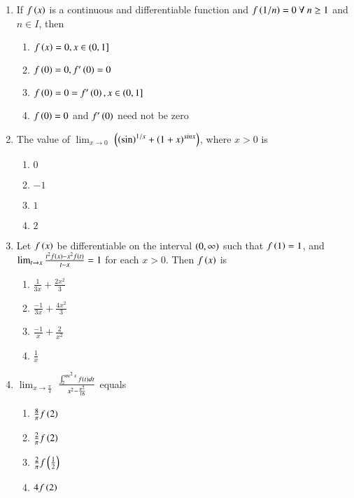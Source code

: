 \documentclass[journal,12pt,onecolumn]{IEEEtran}
\theoremstyle{remark}
\begin{document}
\begin{enumerate}
\item %

	If $f\left(x\right)$ is a continuous and differentiable function and $f\left(1/n\right)=0\ \forall\ n\geq1$ and$ n\in I$, then   \hfill{}
    \begin{enumerate}
	    \item $f\left(x\right)=0,x\in(0,1]$
	    \item $f\left(0\right)=0,f^{\prime}\left(0\right)=0$
	    \item $f\left(0\right)=0=f^{\prime}\left(0\right), x\in(0,1]$
	    \item $f\left(0\right)=0$ and $f^{\prime}\left(0\right)$ need not be zero\\
    \end{enumerate}


\item %

	The value of $\lim_{x \to 0}$ $\left( \left(\sin\right)^{1/x} + \left(1+x\right)^{sinx}\right)$, where $x > 0$ is \hfill{}
    \begin{enumerate}
     \item $0$
     \item $-1$
     \item $1$
     \item $2$\\
    \end{enumerate}

\newpage
\item %

	Let $f\left(x\right)$ be differentiable on the interval $\left(0,\infty\right)$ such that $f\left(1\right)=1$, and $\lim_{t \to x} \frac{t^2f\left(x\right)-x^2f\left(t\right)}{t-x}=1$ for each $x>0$. Then $f\left(x\right)$ is \hfill{}
    \begin{enumerate}
     \item $\frac{1}{3x}+\frac{2x^2}{3}$\\
     \item $\frac{-1}{3x}+\frac{4x^2}{3}$\\
     \item $\frac{-1}{x}+\frac{2}{x^2}$\\
     \item $\frac{1}{x}$\\
    \end{enumerate}


\item %

	$\lim_{x \to \frac{\pi}{4}}$ $ \frac{\int_2^{\sec^2 x} f\left(t\right) dt}{x^2-\frac{\pi^2}{16}}$ equals \hfill{}
    \begin{enumerate}
	    \item $\frac{8}{\pi}f\left(2\right)$
     \item $\frac{2}{\pi}f\left(2\right)$
     \item $\frac{2}{\pi}f\left(\frac{1}{2}\right)$
     \item $4f\left(2\right)$\\
    \end{enumerate}


\end{enumerate}
\end{document}
